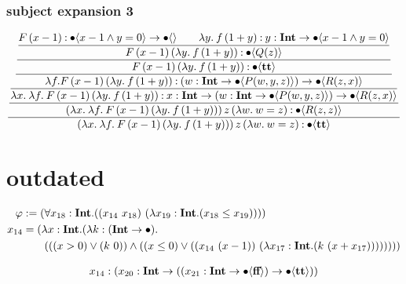 \documentclass{article}
\begin{document}
\subsubsection{subject expansion 3}
\begin{equation*}
    \dfrac{
        \dfrac{
            \dfrac{
                \dfrac{
                    \dfrac{
                        \dfrac{
                            F\, (x-1)\mathbin{:}  \bullet \langle x - 1 \wedge y = 0 \rangle \to \bullet \langle  \rangle  \qquad
                            \lambda y.\: f\,(1+y) \mathbin{:} {y} : \textbf{Int} \to \bullet \langle x - 1 \wedge y = 0 \rangle
                        }{
                            F\, (x-1)\, (\lambda y.\: f\,(1+y)) \mathbin{:} \bullet \langle Q(z) \rangle
                        }
                    } {
                        F\, (x-1)\, (\lambda y.\: f\,(1+y)) \mathbin{:} \bullet \langle \textbf{tt} \rangle
                    }
                }{
                    \lambda f. F\, (x-1)\, (\lambda y.\: f\,(1+y)) \mathbin{:} ({w} : \textbf{Int} \to \bullet \langle P(w, y, z) \rangle) \to \bullet \langle R(z, x) \rangle
                }
            }{
                \lambda x.\: \lambda f.\: F\, (x-1)\, (\lambda y.\: f\,(1+y)) \mathbin{:} {x} : \textbf{Int} \to ({w} : \textbf{Int} \to \bullet \langle P(w, y, z) \rangle) \to \bullet \langle R(z, x) \rangle
            }
        }{
            (\lambda x.\: \lambda f.\: F\, (x-1)\, (\lambda y.\: f\,(1+y)))\, z\, (\lambda w.\: w = z) \mathbin{:} \bullet \langle R(z, z) \rangle
        }
    }{
        (\lambda x.\: \lambda f.\: F\, (x-1)\, (\lambda y.\: f\,(1+y)))\, z\, (\lambda w.\: w = z) \mathbin{:} \bullet \langle \textbf{tt} \rangle
    }
\end{equation*}

\section{outdated}

\begin{align*}
    \varphi &:= (\forall x_{ 18 }: \textbf{Int} . ((x_{ 14 }\  x_{ 18 } )\ (\lambda x_{ 19 }: \textbf{Int} . ( x_{ 18 }  \leq  x_{ 19 } ))))\\
    x_{ 14 } &=
    (\lambda x: \textbf{Int} . (\lambda k: (\textbf{Int}  \to \bullet
    ). \\
    &\qquad ((( x  >  0 )\lor (k\  0 ))\land (( x  \leq  0 )\lor ((x_{ 14 }\ ( x   -   1 ))\ (\lambda x_{ 17 }: \textbf{Int} . (k\ ( x   +   x_{ 17 } )))))))) \\
\end{align*}


\begin{align*}
x_{ 14 } &: ({ x_{ 20 } } : \textbf{Int} \to (({ x_{ 21 } } : \textbf{Int} \to \bullet \langle  \textbf{ff}  \rangle)\to \bullet \langle  \textbf{tt}  \rangle))\\
\end{align*}
\end{document}
